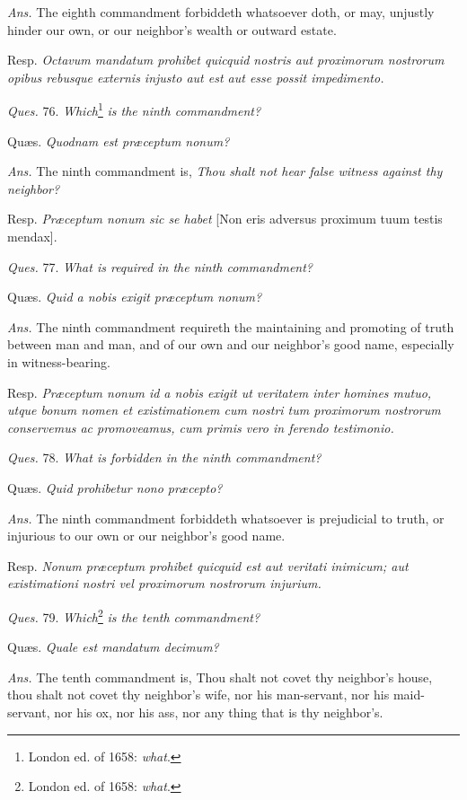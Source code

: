\emph{Ans.} The eighth commandment forbiddeth whatsoever doth, or may, unjustly hinder our own, or our neighbor's wealth or outward estate.

Resp. \emph{Octavum mandatum prohibet quicquid nostris aut proximorum nostrorum opibus rebusque externis injusto aut est aut esse possit impedimento.}

\emph{Ques.} 76. \emph{Which}\footnote{London ed. of 1658: \emph{what}.} \emph{is the ninth commandment?}

Quæs. \emph{Quodnam est præceptum nonum?}

\emph{Ans.} The ninth commandment is, \emph{Thou shalt not hear false witness against thy neighbor?}

Resp. \emph{Præceptum nonum sic se habet} [Non eris adversus proximum tuum testis mendax].

\emph{Ques.} 77. \emph{What is required in the ninth commandment?}

Quæs. \emph{Quid a nobis exigit præceptum nonum?}

\emph{Ans.} The ninth commandment requireth the maintaining and promoting of truth between man and man, and of our own and our neighbor's good name, especially in witness-bearing.

Resp. \emph{Præceptum nonum id a nobis exigit ut veritatem inter homines mutuo, utque bonum nomen et existimationem cum nostri tum proximorum nostrorum conservemus ac promoveamus, cum primis vero in ferendo testimonio.}

\emph{Ques.} 78. \emph{What is forbidden in the ninth commandment?}

Quæs. \emph{Quid prohibetur nono præcepto?}

\emph{Ans.} The ninth commandment forbiddeth whatsoever is prejudicial to truth, or injurious to our own or our neighbor's good name.

Resp. \emph{Nonum præceptum prohibet quicquid est aut veritati inimicum; aut existimationi nostri vel proximorum nostrorum injurium.}

\emph{Ques.} 79. \emph{Which}\footnote{London ed. of 1658: \emph{what}.} \emph{is the tenth commandment?}

Quæs. \emph{Quale est mandatum decimum?}

\emph{Ans.} The tenth commandment is, Thou shalt not covet thy neighbor's house, thou shalt not covet thy neighbor's wife, nor his man-servant, nor his maid-servant, nor his ox, nor his ass, nor any thing that is thy neighbor's.

